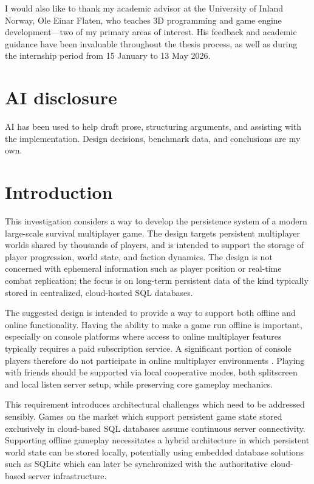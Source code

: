 \documentclass{article}
\begin{document}
I would also like to thank my academic advisor at the University of Inland Norway, Ole Einar Flaten, who teaches 3D programming and game engine development—two of my primary areas of interest. His feedback and academic guidance have been invaluable throughout the thesis process, as well as during the internship period from 15 January to 13 May 2026.

\section*{AI disclosure}

AI has been used to help draft prose, structuring arguments, and assisting with the implementation. Design decisions, benchmark data, and conclusions are my own.

\newpage

\tableofcontents{}

\newpage

\lstlistoflistings

\newpage


\section{Introduction}

This investigation considers a way to develop the persistence system of a modern large-scale survival multiplayer game. The design targets persistent multiplayer worlds shared by thousands of players, and is intended to support the storage of player progression, world state, and faction dynamics. The design is not concerned with ephemeral information such as player position or real-time combat replication; the focus is on long-term persistent data of the kind typically stored in centralized, cloud-hosted SQL databases.

The suggested design is intended to provide a way to support both offline and online functionality. Having the ability to make a game run offline is important, especially on console platforms where access to online multiplayer features typically requires a paid subscription service. A significant portion of console players therefore do not participate in online multiplayer environments \autocite{onlinegamers}. Playing with friends should be supported via local cooperative modes, both splitscreen and local listen server setup, while preserving core gameplay mechanics.

This requirement introduces architectural challenges which need to be addressed sensibly. Games on the market which support persistent game state stored exclusively in cloud-based SQL databases assume continuous server connectivity. Supporting offline gameplay necessitates a hybrid architecture in which persistent world state can be stored locally, potentially using embedded database solutions such as SQLite \autocite{sqliteorg} which can later be synchronized with the authoritative cloud-based server infrastructure.
\end{document}
